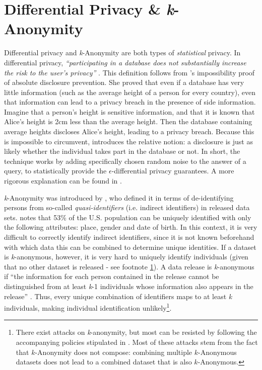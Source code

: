 \section{Differential Privacy \& \textit{k}-Anonymity}
\label{sec:statistical-privacy}
Differential privacy and \textit{k}-Anonymity are both types of \textit{statistical} privacy. In differential privacy, \textit{``participating in a database does not substantially increase the risk to the user's privacy''} \citep{diff-privacy}.  This definition follows from \citeauthor{diff-privacy}'s impossibility proof of absolute disclosure prevention. She proved that even if a database has very little information (such as the average height of a person for every country), even that information can lead to a privacy breach in the presence of side information. Imagine that a person's height is sensitive information, and that it is known that Alice's height is 2cm less than the average height. Then the database containing average heights discloses Alice's height, leading to a privacy breach. Because this is impossible to circumvent, \citeauthor{diff-privacy} introduces the relative notion: a disclosure is just as likely whether the individual takes part in the database or not. In short, the technique works by adding specifically chosen random noise to the answer of a query, to statistically provide the \textit{$\epsilon$}-differential privacy guarantees. A more rigorous explanation can be found in \citet[p9-11]{diff-privacy}.

\textit{k}-Anonymity was introduced by \citet{k-anonymity}, who defined it in terms of de-identifying persons from so-called \textit{quasi-identifiers} (i.e. indirect identifiers) in released data sets. \citet{demographics-identify-unique} notes that 53\% of the U.S. population can be uniquely identified with only the following attributes: place, gender and date of birth. In this context, it is very difficult to correctly identify indirect identifiers, since it is not known beforehand with which data this can be combined to determine unique identities. If a dataset is \textit{k}-anonymous, however, it is very hard to uniquely identify individuals (given that no other dataset is released - see footnote \ref{foot:k-anon-attacks}). A data release is \textit{k}-anonymous if ``the information for each person contained in the release cannot be distinguished from at least \textit{k}-1 individuals whose information also appears in the release'' \citep{k-anonymity}. Thus, every unique combination of identifiers maps to at least \textit{k} individuals, making individual identification unlikely\footnote{\label{foot:k-anon-attacks}There exist attacks on \textit{k}-anonymity, but most can be resisted by following the accompanying policies stipulated in \citet{k-anonymity}. Most of these attacks stem from the fact that $k$-Anonymity does not compose: combining multiple $k$-Anonymous datasets does not lead to a combined dataset that is also $k$-Anonymous.}.

